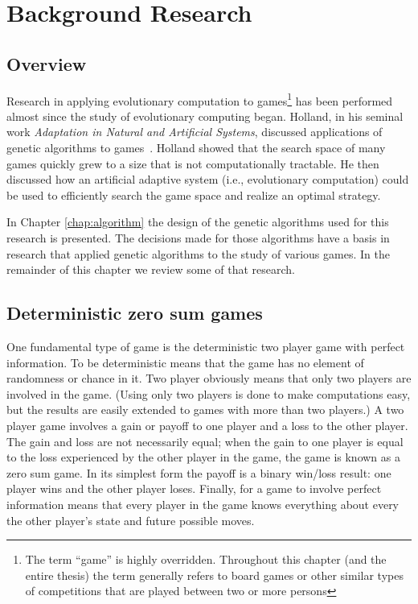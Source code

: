 \clearpage
\chapter{Background Research}\label{chap:background}

\section{Overview}

Research in applying evolutionary computation to games\footnote{The term
``game'' is highly overridden. Throughout this chapter (and the entire thesis)
the term generally refers to board games or other similar types of competitions
that are played between two or more persons} has been performed almost since the
study of evolutionary computing began. Holland, in his seminal work
\emph{Adaptation in Natural and Artificial Systems}, discussed applications of
genetic algorithms to games~\cite{holland1975adaptation,Holland1992}. Holland
showed that the search space of many games quickly grew to a size that is not
computationally tractable. He then discussed how an artificial adaptive system
(i.e., evolutionary computation) could be used to efficiently search the game
space and realize an optimal strategy.

In Chapter \ref{chap:algorithm} the design of the genetic algorithms used for
this research is presented. The decisions made for those algorithms have a basis
in research that applied genetic algorithms to the study of various games. In
the remainder of this chapter we review some of that research.

\section{Deterministic zero sum games}

One fundamental type of game is the deterministic two player game with perfect
information. To be deterministic means that the game has no element of
randomness or chance in it. Two player obviously means that only two players are
involved in the game. (Using only two players is done to make computations easy,
but the results are easily extended to games with more than two players.) A two
player game involves a gain or payoff to one player and a loss to the other
player. The gain and loss are not necessarily equal; when the gain to one player
is equal to the loss experienced by the other player in the game, the game is
known as a zero sum game. In its simplest form the payoff is a binary win/loss
result: one player wins and the other player loses. Finally, for a game to
involve perfect information means that every player in the game knows everything
about every the other player's state and future possible moves.


